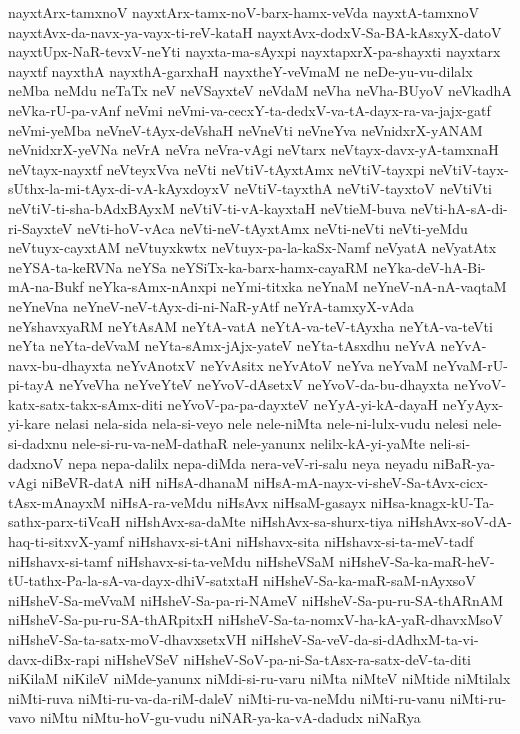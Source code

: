 {nayxtArx-tamxnoV
nayxtArx-tamx-noV-barx-hamx-veVda
nayxtA-tamxnoV
nayxtAvx-da-navx-ya-vayx-ti-reV-kataH
nayxtAvx-dodxV-Sa-BA-kAsxyX-datoV
nayxtUpx-NaR-tevxV-neYti
nayxta-ma-sAyxpi
nayxtapxrX-pa-shayxti
nayxtarx
nayxtf
nayxthA
nayxthA-garxhaH
nayxtheY-veVmaM
ne
neDe-yu-vu-dilalx
neMba
neMdu
neTaTx
neV
neVSayxteV
neVdaM
neVha
neVha-BUyoV
neVkadhA
neVka-rU-pa-vAnf
neVmi
neVmi-va-cecxY-ta-dedxV-va-tA-dayx-ra-va-jajx-gatf
neVmi-yeMba
neVneV-tAyx-deVshaH
neVneVti
neVneYva
neVnidxrX-yANAM
neVnidxrX-yeVNa
neVrA
neVra
neVra-vAgi
neVtarx
neVtayx-davx-yA-tamxnaH
neVtayx-nayxtf
neVteyxVva
neVti
neVtiV-tAyxtAmx
neVtiV-tayxpi
neVtiV-tayx-sUthx-la-mi-tAyx-di-vA-kAyxdoyxV
neVtiV-tayxthA
neVtiV-tayxtoV
neVtiVti
neVtiV-ti-sha-bAdxBAyxM
neVtiV-ti-vA-kayxtaH
neVtieM-buva
neVti-hA-sA-di-ri-SayxteV
neVti-hoV-vAca
neVti-neV-tAyxtAmx
neVti-neVti
neVti-yeMdu
neVtuyx-cayxtAM
neVtuyxkwtx
neVtuyx-pa-la-kaSx-Namf
neVyatA
neVyatAtx
neYSA-ta-keRVNa
neYSa
neYSiTx-ka-barx-hamx-cayaRM
neYka-deV-hA-Bi-mA-na-Bukf
neYka-sAmx-nAnxpi
neYmi-titxka
neYnaM
neYneV-nA-nA-vaqtaM
neYneVna
neYneV-neV-tAyx-di-ni-NaR-yAtf
neYrA-tamxyX-vAda
neYshavxyaRM
neYtAsAM
neYtA-vatA
neYtA-va-teV-tAyxha
neYtA-va-teVti
neYta
neYta-deVvaM
neYta-sAmx-jAjx-yateV
neYta-tAsxdhu
neYvA
neYvA-navx-bu-dhayxta
neYvAnotxV
neYvAsitx
neYvAtoV
neYva
neYvaM
neYvaM-rU-pi-tayA
neYveVha
neYveYteV
neYvoV-dAsetxV
neYvoV-da-bu-dhayxta
neYvoV-katx-satx-takx-sAmx-diti
neYvoV-pa-pa-dayxteV
neYyA-yi-kA-dayaH
neYyAyx-yi-kare
nelasi
nela-sida
nela-si-veyo
nele
nele-niMta
nele-ni-lulx-vudu
nelesi
nele-si-dadxnu
nele-si-ru-va-neM-dathaR
nele-yanunx
nelilx-kA-yi-yaMte
neli-si-dadxnoV
nepa
nepa-dalilx
nepa-diMda
nera-veV-ri-salu
neya
neyadu
niBaR-ya-vAgi
niBeVR-datA
niH
niHsA-dhanaM
niHsA-mA-nayx-vi-sheV-Sa-tAvx-cicx-tAsx-mAnayxM
niHsA-ra-veMdu
niHsAvx
niHsaM-gasayx
niHsa-knagx-kU-Ta-sathx-parx-tiVcaH
niHshAvx-sa-daMte
niHshAvx-sa-shurx-tiya
niHshAvx-soV-dA-haq-ti-sitxvX-yamf
niHshavx-si-tAni
niHshavx-sita
niHshavx-si-ta-meV-tadf
niHshavx-si-tamf
niHshavx-si-ta-veMdu
niHsheVSaM
niHsheV-Sa-ka-maR-heV-tU-tathx-Pa-la-sA-va-dayx-dhiV-satxtaH
niHsheV-Sa-ka-maR-saM-nAyxsoV
niHsheV-Sa-meVvaM
niHsheV-Sa-pa-ri-NAmeV
niHsheV-Sa-pu-ru-SA-thARnAM
niHsheV-Sa-pu-ru-SA-thARpitxH
niHsheV-Sa-ta-nomxV-ha-kA-yaR-dhavxMsoV
niHsheV-Sa-ta-satx-moV-dhavxsetxVH
niHsheV-Sa-veV-da-si-dAdhxM-ta-vi-davx-diBx-rapi
niHsheVSeV
niHsheV-SoV-pa-ni-Sa-tAsx-ra-satx-deV-ta-diti
niKilaM
niKileV
niMde-yanunx
niMdi-si-ru-varu
niMta
niMteV
niMtide
niMtilalx
niMti-ruva
niMti-ru-va-da-riM-daleV
niMti-ru-va-neMdu
niMti-ru-vanu
niMti-ru-vavo
niMtu
niMtu-hoV-gu-vudu
niNAR-ya-ka-vA-dadudx
niNaRya
}
